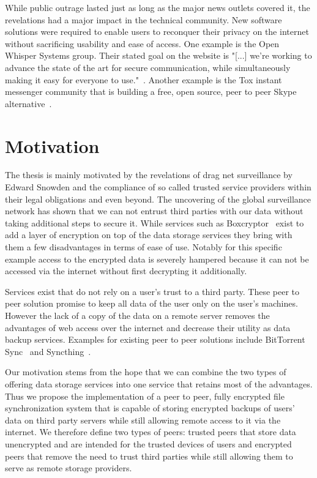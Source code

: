 While public outrage lasted just as long as the major news outlets covered it, the revelations had a major impact in the technical community.
New software solutions were required to enable users to reconquer their privacy on the internet without sacrificing usability and ease of access.
One example is the Open Whisper Systems group.
Their stated goal on the website is "[...] we're working to advance the state of the art for secure communication, while simultaneously making it easy for everyone to use."~\cite{web:site:whispersystems}.
Another example is the Tox instant messenger community that is building a free, open source, peer to peer Skype alternative~\cite{web:site:tox}.

\section{Motivation}
\label{sec:Motivation} %

The thesis is mainly motivated by the revelations of drag net surveillance by Edward Snowden and the compliance of so called trusted service providers within their legal obligations and even beyond.
The uncovering of the global surveillance network has shown that we can not entrust third parties with our data without taking additional steps to secure it.
While services such as Boxcryptor~\cite{web:site:boxcryptor} exist to add a layer of encryption on top of the data storage services they bring with them a few disadvantages in terms of ease of use.
Notably for this specific example access to the encrypted data is severely hampered because it can not be accessed via the internet without first decrypting it additionally.

Services exist that do not rely on a user's trust to a third party.
These peer to peer solution promise to keep all data of the user only on the user's machines.
However the lack of a copy of the data on a remote server removes the advantages of web access over the internet and decrease their utility as data backup services.
Examples for existing peer to peer solutions include BitTorrent Sync~\cite{web:site:bittorrent_sync} and Syncthing~\cite{web:site:synthing}.

Our motivation stems from the hope that we can combine the two types of offering data storage services into one service that retains most of the advantages.
Thus we propose the implementation of a peer to peer, fully encrypted file synchronization system that is capable of storing encrypted backups of users' data on third party servers while still allowing remote access to it via the internet.
We therefore define two types of peers: trusted peers that store data unencrypted and are intended for the trusted devices of users and encrypted peers that remove the need to trust third parties while still allowing them to serve as remote storage providers.

